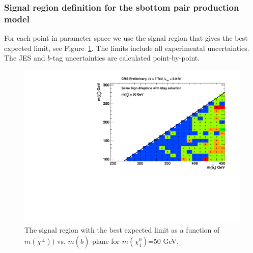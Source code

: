 \subsubsection{Signal region definition for the sbottom pair production model}
\label{sec:sbottompairdefinition}
For each point in parameter space we use the signal region that gives
the best expected limit, see Figure~\ref{fig:sbottomoptimize}.
The limits include all experimental 
uncertainties.   The JES and $b$-tag uncertainties are calculated point-by-point.


\begin{figure}[htb]
\begin{center}
\includegraphics[width=0.5\linewidth]{figs/B1_BestSignalRegion.pdf}
\caption{The signal region with the best expected limit as a function of 
$m(\chi^{\pm}))$ vs. $m(\widetilde{b})$ plane for $m(\chi^0_1)$=50 GeV.
\label{fig:sbottomoptimize}}
\end{center}
\end{figure}


